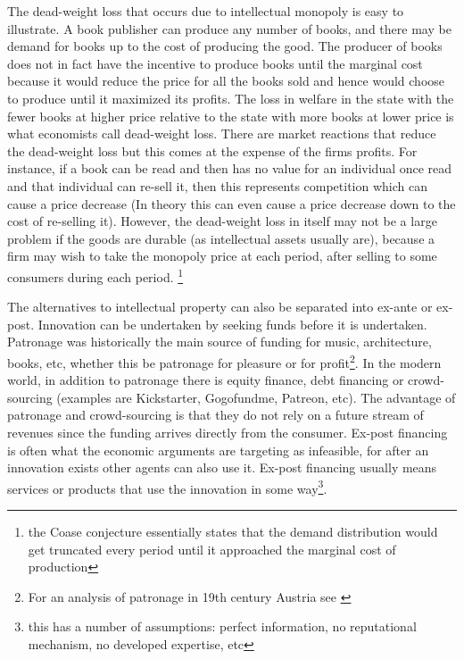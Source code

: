 \documentclass[12pt]{report}
\numberwithin{equation}{section}
\begin{document}
The dead-weight loss that occurs due to intellectual monopoly is easy to illustrate. A book publisher can produce any number of books, and there may be demand for books up to the cost of producing the good. The producer of books does not in fact have the incentive to produce books until the marginal cost because it would reduce the price for all the books sold and hence would choose to produce until it maximized its profits. The loss in welfare in the state with the fewer books at higher price relative to the state with more books at lower price is what economists call dead-weight loss. There are market reactions that reduce the dead-weight loss but this comes at the expense of the firms profits. For instance, if a book can be read and then has no value for an individual once read and that individual can re-sell it, then this represents competition which can cause a price decrease (In theory this can even cause a price decrease down to the cost of re-selling it). However, the dead-weight loss in itself may not be a large problem if the goods are durable (as intellectual assets usually are), because a firm may wish to take the monopoly price at each period, after selling to some consumers during each period. \footnote{the Coase conjecture essentially states that the demand distribution would get truncated every period until it approached the marginal cost of production}%

The alternatives to intellectual property can also be separated into ex-ante or ex-post. Innovation can be undertaken by seeking funds before it is undertaken. Patronage was historically the main source of funding for music, architecture, books, etc, whether this be patronage for pleasure or for profit\footnote{For an analysis of patronage in 19th century Austria see \cite{carletti2013top} }. In the modern world, in addition to patronage there is equity finance, debt financing or crowd-sourcing (examples are Kickstarter, Gogofundme, Patreon, etc). The advantage of patronage and crowd-sourcing is that they do not rely on a future stream of revenues since the funding arrives directly from the consumer. Ex-post financing is often what the economic arguments are targeting as infeasible, for after an innovation exists other agents can also use it. Ex-post financing usually means services or products that use the innovation in some way\footnote{ this has a number of assumptions: perfect information, no reputational mechanism, no developed expertise, etc }.

\end{document}
